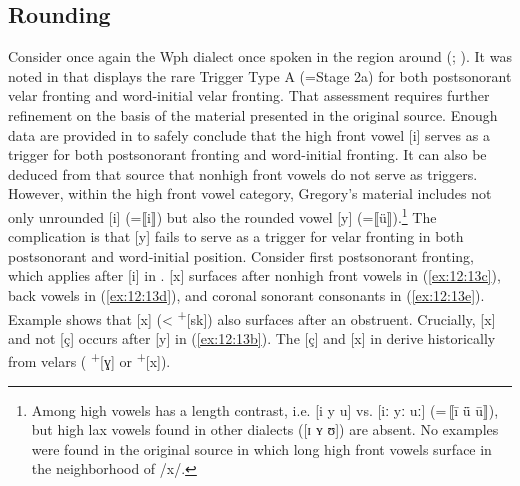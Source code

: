 \subsection{Rounding}\label{sec:12.6.1}

Consider once again the Wph dialect once spoken in the region around  (\citealt{Gregory1934}; ). It was noted in  that  displays the rare Trigger Type A (=Stage 2a) for both postsonorant velar fronting and word-initial velar fronting. That assessment requires further refinement on the basis of the material presented in the original source. Enough data are provided in \citet{Gregory1934} to safely conclude that the high front vowel [i] serves as a trigger for both postsonorant fronting and word-initial fronting. It can also be deduced from that source that nonhigh front vowels do not serve as triggers. However, within the high front vowel category, Gregory’s material includes not only unrounded [i] (=⟦i⟧) but also the rounded vowel [y] (=⟦ü⟧).\footnote{{Among high vowels  has a length contrast, i.e. [i y u] vs. [iː yː uː] (=\,⟦ī ǖ ū⟧), but high lax vowels found in other dialects ([ɪ ʏ ʊ]) are absent. No examples were found in the original source in which long high front vowels surface in the neighborhood of /x/.}} The complication is that [y] fails to serve as a trigger for velar fronting in both postsonorant and word-initial position. Consider first postsonorant fronting, which applies after [i] in . [x] surfaces after nonhigh front vowels in (\ref{ex:12:13c}), back vowels in (\ref{ex:12:13d}), and coronal sonorant consonants in (\ref{ex:12:13e}). Example  shows that [x] (< \textsuperscript{+}[sk]) also surfaces after an obstruent. Crucially, [x] and not [ç] occurs after [y] in (\ref{ex:12:13b}). The [ç] and [x] in  derive historically from velars ( \textsuperscript{+}[ɣ] or \textsuperscript{+}[x]).

